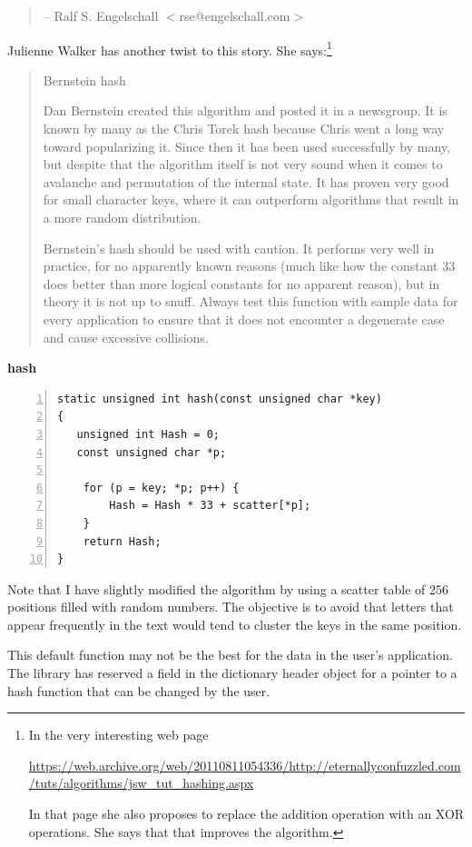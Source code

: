 \documentclass[12pt,a4paper,openany]{memoir} %
\newif\iftth
\newcommand{\container}{}
\newcommand{\function}[1] {%
\vspace{0.2in}
\par\noindent
\textbf{#1}\index{#1!code for \container} \hrulefill
\iftth\else
\nopagebreak
\fi
\noindent\begin{Verbatim}[numbers=left, xleftmargin=7mm]}
\begin{document}
{{\begin{quotation}
{                 -- Ralf S. Engelschall $<$rse@engelschall.com$>$
}                
\end{quotation}
Julienne Walker has another twist to this story. She says:\footnote{In the very interesting web page \par\noindent
\url{https://web.archive.org/web/20110811054336/http://eternallyconfuzzled.com/tuts/algorithms/jsw_tut_hashing.aspx}\par\noindent In that page she also proposes to replace the addition operation with an XOR operations. She says that that improves the algorithm.}
\begin{quotation}
Bernstein hash

Dan Bernstein created this algorithm and posted it in a newsgroup. It is known by many as the Chris Torek hash because Chris went a long way toward popularizing it. Since then it has been used successfully by many, but despite that the algorithm itself is not very sound when it comes to avalanche and permutation of the internal state. It has proven very good for small character keys, where it can outperform algorithms that result in a more random distribution.

Bernstein's hash should be used with caution. It performs very well in practice, for no apparently known reasons (much like how the constant 33 does better than more logical constants for no apparent reason), but in theory it is not up to snuff. Always test this function with sample data for every application to ensure that it does not encounter a degenerate case and cause excessive collisions.
\end{quotation}
\function{hash}
static unsigned int hash(const unsigned char *key)
{
   unsigned int Hash = 0;
   const unsigned char *p;
		
    for (p = key; *p; p++) {
        Hash = Hash * 33 + scatter[*p];
    }
    return Hash;
}
\end{Verbatim}
Note that I have slightly modified the algorithm by using a scatter table of 256 positions filled with random numbers. The objective is to avoid
that letters that appear frequently in the text would tend to cluster the keys in  the same position.

This default function may not be the best for the data in the user's application. The library has reserved a field in the dictionary header object for a pointer to a hash function that can be changed by the user.

}}
\end{document}
